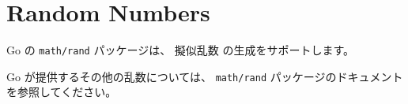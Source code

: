 \section{Random Numbers}

Go の \texttt{math/rand} パッケージは、 擬似乱数 の生成をサポートします。




Go が提供するその他の乱数については、 \texttt{math/rand} パッケージのドキュメントを参照してください。